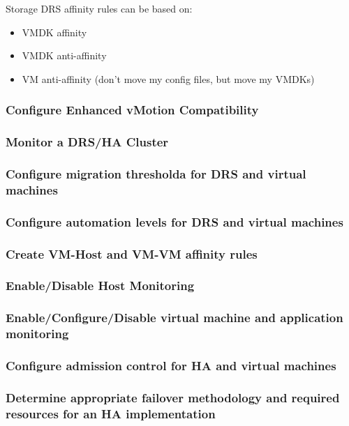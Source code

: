 Storage DRS affinity rules can be based on:

\begin{itemize}

\item VMDK affinity
\item VMDK anti-affinity
\item VM anti-affinity (don't move my config files, but move my VMDKs)

\end{itemize}

\subsubsection{Configure Enhanced vMotion Compatibility}

\subsubsection{Monitor a DRS/HA Cluster}

\subsubsection{Configure migration thresholda for DRS and virtual machines}

\subsubsection{Configure automation levels for DRS and virtual machines}

\subsubsection{Create VM-Host and VM-VM affinity rules}

\subsubsection{Enable/Disable Host Monitoring}

\subsubsection{Enable/Configure/Disable virtual machine and application monitoring}

\subsubsection{Configure admission control for HA and virtual machines}

\subsubsection{Determine appropriate failover methodology and required resources for an HA implementation}
